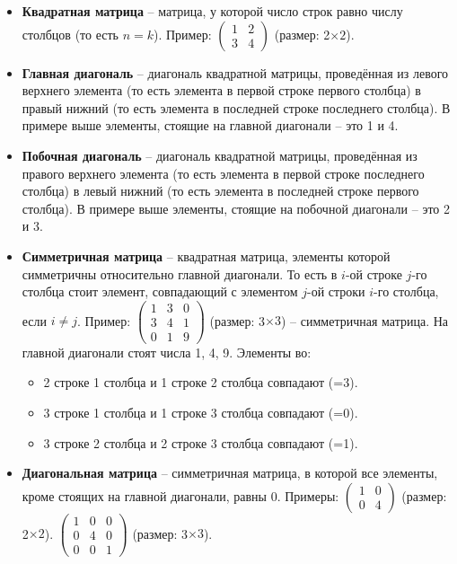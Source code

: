 \documentclass[11pt, a4paper]{extarticle}
\begin{document}
\begin{itemize}
	\item \textbf{Квадратная матрица} – матрица, у которой число строк равно числу столбцов (то есть $n = k$). Пример: $\begin{pmatrix}
	1 & 2 \\
	3 & 4
	\end{pmatrix}$ (размер: 2$\times2$).
	
	\item \textbf{Главная диагональ} – диагональ квадратной матрицы, проведённая из левого верхнего элемента  (то есть элемента в первой строке первого столбца) в правый нижний (то есть элемента в последней строке последнего столбца). В примере выше элементы, стоящие на главной диагонали – это 1 и 4. 
	
	\item \textbf{Побочная диагональ} – диагональ квадратной матрицы, проведённая из правого верхнего элемента  (то есть элемента в первой строке последнего столбца) в левый нижний (то есть элемента в последней строке первого столбца). В примере выше элементы, стоящие на побочной диагонали – это 2 и 3. 
	
	\item \textbf{Симметричная матрица} – квадратная матрица, элементы которой симметричны относительно главной диагонали. То есть в $i$-ой строке $j$-го столбца стоит элемент, совпадающий с элементом $j$-ой строки $i$-го столбца, если $i\ne j$. Пример: $\begin{pmatrix}
	1 & 3 & 0 \\
	3 & 4 & 1 \\
	0 & 1 & 9
	\end{pmatrix}$ (размер: 3$\times3$) – симметричная матрица. На главной диагонали стоят числа 1, 4, 9. Элементы во:
	\begin{itemize}
		\item 2 строке 1 столбца и 1 строке 2 столбца совпадают (=3).
		\item 3 строке 1 столбца и 1 строке 3 столбца совпадают (=0).
		\item 3 строке 2 столбца и 2 строке 3 столбца совпадают (=1).
	\end{itemize}

	\item \textbf{Диагональная матрица} – симметричная матрица, в которой все элементы, кроме стоящих на главной диагонали, равны 0. Примеры: $\begin{pmatrix}
	1 & 0 \\
	0 & 4
	\end{pmatrix}$ (размер: 2$\times2$). $\begin{pmatrix}
	1 & 0 & 0 \\
	0 & 4 & 0 \\
	0 & 0 & 1
	\end{pmatrix}$ (размер: 3$\times3$).
	

\end{itemize}
\end{document}
